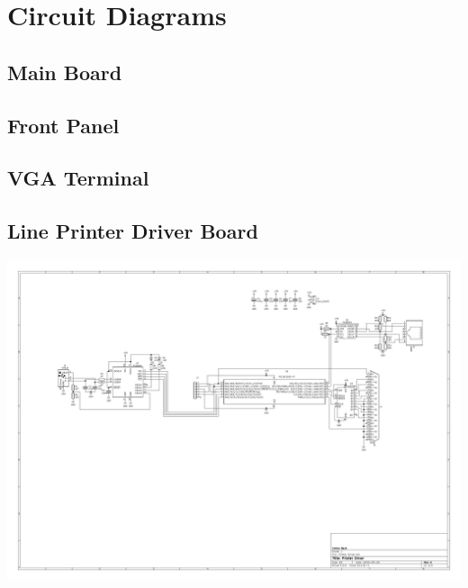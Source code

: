 \documentclass{book}
\begin{document}
\chapter{Circuit Diagrams}
\section{Main Board}
\clearpage

\section{Front Panel}
\clearpage

\section{VGA Terminal}
\clearpage

\section{Line Printer Driver Board}
\begin{sideways}
\centering
\includegraphics[height=1.1\textwidth]{../Board_Layouts/Printer_Driver/Printer_Driver.pdf}
\end{sideways}
\clearpage
\end{document}
